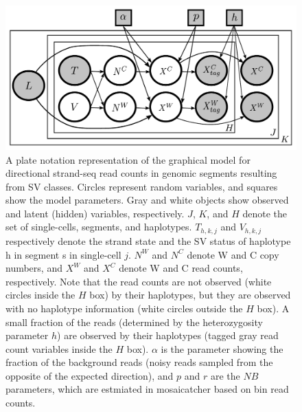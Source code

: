 \documentclass[12pt]{article}
\renewcommand{\j}{j} %
\newcommand{\X}{X} %
\renewcommand{\k}{k} %
\newcommand{\h}{h} %
\newcommand{\T}{T} %
\newcommand{\V}{V} %
\newcommand{\N}{N} %
\begin{document}
\begin{figure}
	\begin{center}
		\includegraphics[width=\textwidth]{graphical_model_v2_haplotagged-equal-sized-circle}
	\end{center}
\caption{A plate notation representation of the graphical model for directional strand-seq read counts in genomic segments resulting from SV classes. Circles represent random variables, and squares show the model parameters. Gray and white objects show observed and latent (hidden) variables, respectively. $J$, $K$, and $H$ denote the set of single-cells, segments, and haplotypes. $\T_{\h,\k,\j}$ and $\V_{\h,\k,\j}$ respectively denote the strand state and the SV status of haplotype h in segment s in single-cell $\j$. $\N^W$ and $\N^C$ denote W and C copy numbers, and $\X^W$ and $\X^C$ denote W and C read counts, respectively. Note that the read counts are not observed (white circles inside the $H$ box) by their haplotypes, but they are observed with no haplotype information (white circles outside the $H$ box). A small fraction of the reads (determined by the heterozygosity parameter $h$) are observed by their haplotypes (tagged gray read count variables inside the $H$ box). $\alpha$ is the parameter showing the fraction of the background reads (noisy reads sampled from the opposite of the expected direction), and $p$ and $r$ are the $NB$ parameters, which are estmiated in mosaicatcher based on bin read counts.}
\end{figure}
\end{document}
